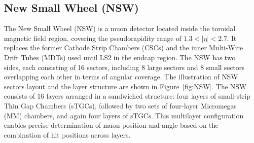 \subsection{New Small Wheel (NSW)}
The New Small Wheel (NSW) is a muon detector located inside the toroidal magnetic field region, covering the pseudorapidity range of $1.3 < |\eta| < 2.7$. It replaces the former Cathode Strip Chambers (CSCs) and the inner Multi-Wire Drift Tubes (MDTs) used until LS2 in the endcap region. The NSW has two sides, each consisting of 16 sectors, including 8 large sectors and 8 small sectors overlapping each other in terms of angular coverage. The illustration of NSW sectors layout and the layer structure are shown in Figure~\ref{fig:NSW}. The NSW consists of 16 layers arranged in a sandwiched structure: four layers of small-strip Thin Gap Chambers (sTGCs), followed by two sets of four-layer Micromegas (MM) chambers, and again four layers of sTGCs. This multilayer configuration enables precise determination of muon position and angle based on the combination of hit positions across layers.

